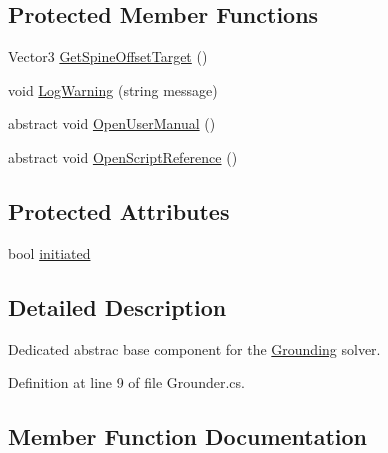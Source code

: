 \subsection*{Protected Member Functions}
\begin{DoxyCompactItemize}
\item 
Vector3 \mbox{\hyperlink{class_root_motion_1_1_final_i_k_1_1_grounder_a3aa3855b32f0316341ff6aa4360721b1}{Get\+Spine\+Offset\+Target}} ()
\item 
void \mbox{\hyperlink{class_root_motion_1_1_final_i_k_1_1_grounder_a779eb7e059b491e6017e6f4085c38801}{Log\+Warning}} (string message)
\item 
abstract void \mbox{\hyperlink{class_root_motion_1_1_final_i_k_1_1_grounder_af214d235ecea1b81ec637b1b61f756cb}{Open\+User\+Manual}} ()
\item 
abstract void \mbox{\hyperlink{class_root_motion_1_1_final_i_k_1_1_grounder_a76777e591f7aac441ea52b1b92c41886}{Open\+Script\+Reference}} ()
\end{DoxyCompactItemize}
\subsection*{Protected Attributes}
\begin{DoxyCompactItemize}
\item 
bool \mbox{\hyperlink{class_root_motion_1_1_final_i_k_1_1_grounder_ab7f74d7009464c8a3aaf65b6af67a741}{initiated}}
\end{DoxyCompactItemize}


\subsection{Detailed Description}
Dedicated abstrac base component for the \mbox{\hyperlink{class_root_motion_1_1_final_i_k_1_1_grounding}{Grounding}} solver. 



Definition at line 9 of file Grounder.\+cs.



\subsection{Member Function Documentation}
\mbox{\label{class_root_motion_1_1_final_i_k_1_1_grounder_a3aa3855b32f0316341ff6aa4360721b1}} 
